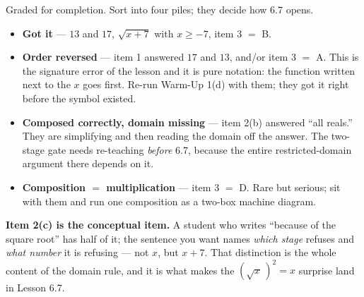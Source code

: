 \documentclass[10pt]{article}
\begin{document}
\begin{teachernote}
\small Graded for completion. Sort into four piles; they decide how 6.7 opens.
\begin{itemize}[leftmargin=1.3em, nosep]
  \item \textbf{Got it} --- $13$ and $17$, $\sqrt{x+7}$ with $x\ge-7$, item 3 $=$ B.
  \item \textbf{Order reversed} --- item 1 answered $17$ and $13$, and/or item 3 $=$ A. This is the
        signature error of the lesson and it is pure notation: the function written next to the $x$
        goes first. Re-run Warm-Up 1(d) with them; they got it right before the symbol existed.
  \item \textbf{Composed correctly, domain missing} --- item 2(b) answered ``all reals.'' They are
        simplifying and then reading the domain off the answer. The two-stage gate needs re-teaching
        \emph{before} 6.7, because the entire restricted-domain argument there depends on it.
  \item \textbf{Composition $=$ multiplication} --- item 3 $=$ D. Rare but serious; sit with them and
        run one composition as a two-box machine diagram.
\end{itemize}
\textbf{Item 2(c) is the conceptual item.} A student who writes ``because of the square root'' has
half of it; the sentence you want names \emph{which stage} refuses and \emph{what number} it is
refusing --- not $x$, but $x+7$. That distinction is the whole content of the domain rule, and it is
what makes the $\left(\sqrt{x}\,\right)^{2}=x$ surprise land in Lesson 6.7.
\end{teachernote}
\end{document}
